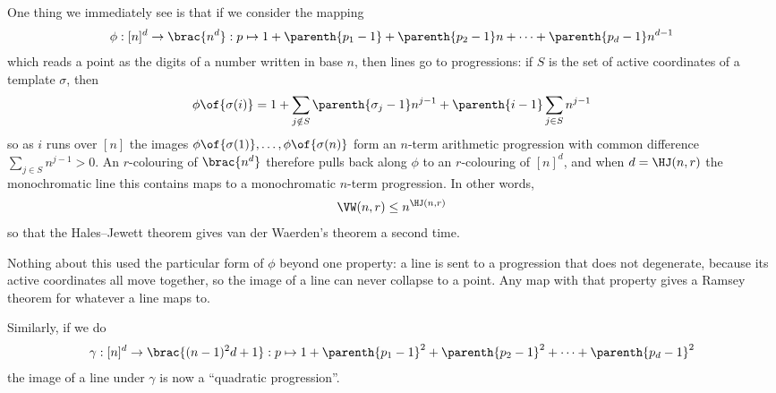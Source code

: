 One thing we immediately see is that if we consider the mapping
\begin{align*}
    \phi : [n]^d \to \brac{n^d} : p \mapsto 1 + \parenth{p_1 - 1} + \parenth{p_2 - 1} n + \cdots + \parenth{p_d - 1} n^{d - 1}
\end{align*}
which reads a point as the digits of a number written in base $n$, then lines go to progressions: if $S$ is the set of active coordinates of a template $\sigma$, then
\begin{align*}
    \phi\of{\sigma(i)} = 1 + \sum_{j \notin S} \parenth{\sigma_j - 1} n^{j - 1} + \parenth{i - 1} \sum_{j \in S} n^{j - 1}
\end{align*}
so as $i$ runs over $[n]$ the images $\phi\of{\sigma(1)}, \ldots, \phi\of{\sigma(n)}$ form an $n$-term arithmetic progression with common difference $\sum_{j \in S} n^{j - 1} > 0$. An $r$-colouring of $\brac{n^d}$ therefore pulls back along $\phi$ to an $r$-colouring of $[n]^d$, and when $d = \HJ(n, r)$ the monochromatic line this contains maps to a monochromatic $n$-term progression. In other words,
\begin{align*}
    \VW(n, r) \leq n^{\HJ(n, r)}
\end{align*}
so that the Hales--Jewett theorem gives van der Waerden's theorem a second time.

Nothing about this used the particular form of $\phi$ beyond one property: a line is sent to a progression that does not degenerate, because its active coordinates all move together, so the image of a line can never collapse to a point. Any map with that property gives a Ramsey theorem for whatever a line maps to.

Similarly, if we do
\begin{align*}
    \gamma : [n]^d \to \brac{(n - 1)^2 d + 1} : p \mapsto 1 + \parenth{p_1 - 1}^2 + \parenth{p_2 - 1}^2 + \cdots + \parenth{p_d - 1}^2
\end{align*}
the image of a line under $\gamma$ is now a ``quadratic progression''.
